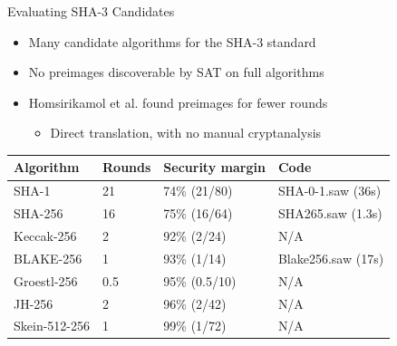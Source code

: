 \documentclass[ignorenonframetext,]{beamer}
\providecommand{\tightlist}{%
  \setlength{\itemsep}{0pt}\setlength{\parskip}{0pt}}
\newcommand{\filelink}[1]{{\alert{#1}}}
\begin{document}
\begin{frame}{Evaluating SHA-3 Candidates}

\begin{itemize}
\tightlist
\item
  Many candidate algorithms for the SHA-3 standard
\item
  No preimages discoverable by SAT on full algorithms
\item
  Homsirikamol et al. found preimages for fewer rounds

  \begin{itemize}
  \tightlist
  \item
    Direct translation, with no manual cryptanalysis
  \end{itemize}
\end{itemize}

\begin{longtable}[c]{@{}llll@{}}
\toprule
Algorithm & Rounds & Security margin & Code\tabularnewline
\midrule
\endhead
SHA-1 & 21 & 74\% (21/80) & \filelink{SHA-0-1.saw} (36s)\tabularnewline
SHA-256 & 16 & 75\% (16/64) & \filelink{SHA265.saw}
(1.3s)\tabularnewline
Keccak-256 & 2 & 92\% (2/24) & N/A\tabularnewline
BLAKE-256 & 1 & 93\% (1/14) & \filelink{Blake256.saw}
(17s)\tabularnewline
Groestl-256 & 0.5 & 95\% (0.5/10) & N/A\tabularnewline
JH-256 & 2 & 96\% (2/42) & N/A\tabularnewline
Skein-512-256 & 1 & 99\% (1/72) & N/A\tabularnewline
\bottomrule
\end{longtable}

\end{frame}
\end{document}
